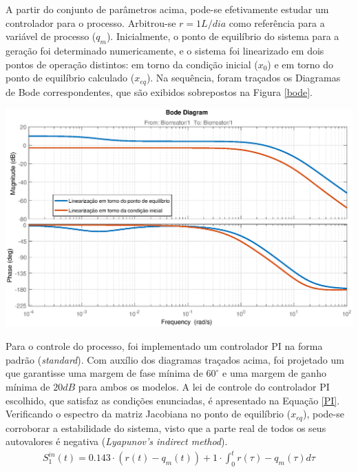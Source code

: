 \documentclass[a0,portrait]{a0poster}
\begin{document}
\begin{multicols}{2}
\begin{tcolorbox}
\end{tcolorbox}
\vspace{1mm}
\quad A partir do conjunto de parâmetros acima, pode-se efetivamente estudar um controlador para o processo. Arbitrou-se $r = 1 L/dia$ como referência para a variável de processo ($q_m$). Inicialmente, o ponto de equilíbrio do sistema para a geração foi determinado numericamente,
e o sistema foi linearizado em dois pontos de operação distintos: em torno da condição inicial ($x_0$) e em torno do ponto de equilíbrio calculado ($x_{eq}$). Na sequência, foram traçados os Diagramas de Bode correspondentes, que são exibidos sobrepostos na Figura \ref{bode}.

\begin{center}
\includegraphics[width=1\linewidth]{bode.eps}
 \label{bode}
\end{center}
\quad Para o controle do processo, foi implementado um controlador PI na forma padrão (\textit{standard}). Com auxílio dos diagramas traçados acima, foi projetado um que garantisse uma margem de fase mínima de $60^\circ$ e uma margem de ganho mínima de $20dB$ para ambos os modelos. A lei de controle do controlador PI escolhido, que satisfaz as condições enunciadas, é apresentado na Equação \ref{PI}. Verificando o espectro da matriz Jacobiana no ponto de equilíbrio ($x_{eq}$), pode-se corroborar a estabilidade do sistema, visto que a parte real de todos os seus autovalores é negativa (\textit{Lyapunov's indirect method}).
\begin{gather}
S_1^{in} (t) =  0.143 \cdot (r(t)-q_m(t)) + 1 \cdot \int_{0}^{t} r(\tau)-q_m(\tau) d\tau  \label{PI}
\end{gather} 
   

\end{multicols}
\end{document}
